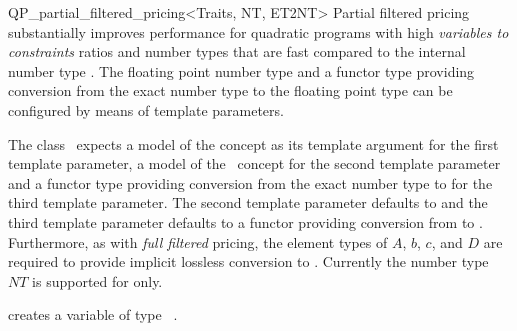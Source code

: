 \begin{ccRefClass}{QP_partial_filtered_pricing<Traits, NT, ET2NT>}
Partial filtered pricing substantially improves performance for
quadratic programs with high \emph{variables to constraints} ratios
and number types  that are fast compared
to the internal number type . The floating point number type 
and a functor type providing conversion from the exact number type  to
the floating point type  can be configured by means of template
parameters.   


\ccInheritsFrom
{}

\ccRequirements
\ccIndexRequirements

The class \ccRefName\ expects a model of the concept
 as its template argument for the first template parameter,
a model of the \cgal\ concept  for the second template
parameter and a functor type
providing conversion from the exact number type  to 
for the third template parameter. The second template parameter defaults to
 and the third template parameter defaults to a functor providing
conversion from  to .  
Furthermore, as with \emph{full filtered} pricing, the element types
of $A$, $b$, $c$, and $D$ are required to provide implicit lossless conversion
to . Currently the number type $NT$ is supported for  only.

\ccTypes \ccIndexClassTypes


\ccCreation
\ccIndexClassCreation
{}

{creates a variable of type \ccRefName\ .}


\ccUnchecked

\ccAccessFunctions
\begin{ccIndexMemberFunctions}




\ccModifiers
{}





\end{ccIndexMemberFunctions}
\end{ccRefClass}
